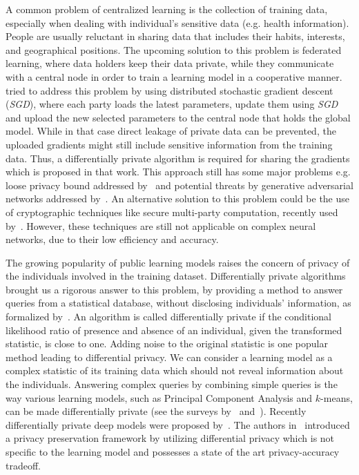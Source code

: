 \documentclass[10pt,journal,compsoc]{IEEEtran}
\begin{document}
A common problem of centralized learning is the collection of training data, especially when dealing with individual's sensitive data (e.g. health information). People are usually reluctant in sharing data that includes their habits, interests, and geographical positions. The upcoming solution to this problem is federated learning, where data holders keep their data private, while they communicate with a central node in order to train a learning model in a cooperative manner. \cite{shokri2015} tried to address this problem by using distributed stochastic gradient descent (\emph{SGD}), where each party loads the latest parameters, update them using \emph{SGD} and upload the new selected parameters to the central node that holds the global model. While in that case direct leakage of private data can be prevented, the uploaded gradients might still include sensitive information from the training data. Thus, a differentially private algorithm is required for sharing the gradients which is proposed in that work. This approach still has some major problems e.g. loose privacy bound addressed by~\cite{papernot2016} and potential threats by generative adversarial networks addressed by~\cite{hitaj2017}. An alternative solution to this problem could be the use of cryptographic techniques like secure multi-party computation, recently used by~\cite{mohassel2017}. However, these techniques are still not applicable on complex neural networks, due to their low efficiency and accuracy. 


The growing popularity of public learning models raises the concern of privacy of the individuals involved in the training dataset. Differentially private algorithms brought us a rigorous answer to this problem, by providing a method to answer queries from a statistical database, without disclosing individuals' information, as formalized by~\cite{dwork06}. An algorithm is called differentially private if the conditional likelihood ratio of presence and absence of an individual, given the transformed statistic, is close to one. Adding noise to the original statistic is one popular method leading to differential privacy. We can consider a learning model as a complex statistic of its training data which should not reveal information about the individuals. Answering complex queries by combining simple queries is the way various learning models, such as Principal Component Analysis and $k$-means, can be made differentially private (see the surveys by~\cite{dwork2008} and~\cite{ji2014}). Recently differentially private deep models were proposed by~\cite{abadi2016}. The authors in~\cite{papernot2016} introduced a privacy preservation framework by utilizing differential privacy which is not specific to the learning model and possesses a state of the art privacy-accuracy tradeoff.
\end{document}

